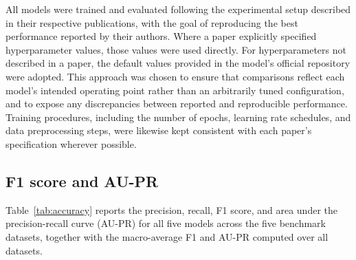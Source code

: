 \documentclass[twoside,11pt,openright]{report}
\begin{document}
All models were trained and evaluated following the experimental setup described in their respective publications, 
with the goal of reproducing the best performance reported by their authors. Where a paper explicitly specified 
hyperparameter values, those values were used directly. For hyperparameters not described in a paper, 
the default values provided in the model's official repository were adopted. This approach was chosen to ensure 
that comparisons reflect each model's intended operating point rather than an arbitrarily tuned configuration, 
and to expose any discrepancies between reported and reproducible performance. Training procedures, including 
the number of epochs, learning rate schedules, and data preprocessing steps, were likewise kept consistent 
with each paper's specification wherever possible.

\subsection{F1 score and AU-PR}

Table~\ref{tab:accuracy} reports the precision, recall, F1 score, and area under the precision-recall curve (AU-PR) 
for all five models across the five benchmark datasets, together with the macro-average F1 and AU-PR computed over all datasets. 
\end{document}
